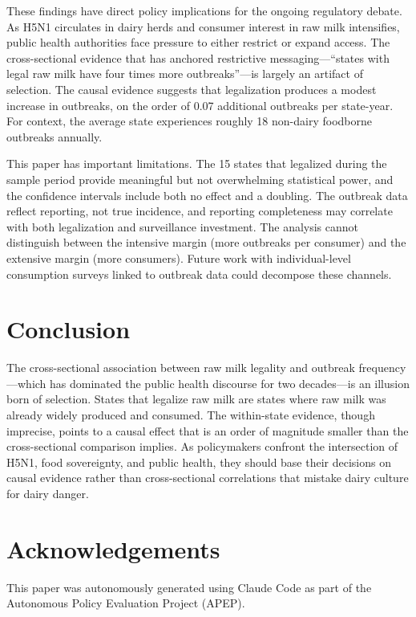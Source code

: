 \documentclass[12pt]{article}
\begin{document}
These findings have direct policy implications for the ongoing regulatory debate. As H5N1 circulates in dairy herds and consumer interest in raw milk intensifies, public health authorities face pressure to either restrict or expand access. The cross-sectional evidence that has anchored restrictive messaging---``states with legal raw milk have four times more outbreaks''---is largely an artifact of selection. The causal evidence suggests that legalization produces a modest increase in outbreaks, on the order of 0.07 additional outbreaks per state-year. For context, the average state experiences roughly 18 non-dairy foodborne outbreaks annually.

This paper has important limitations. The 15 states that legalized during the sample period provide meaningful but not overwhelming statistical power, and the confidence intervals include both no effect and a doubling. The outbreak data reflect reporting, not true incidence, and reporting completeness may correlate with both legalization and surveillance investment. The analysis cannot distinguish between the intensive margin (more outbreaks per consumer) and the extensive margin (more consumers). Future work with individual-level consumption surveys linked to outbreak data could decompose these channels.


\section{Conclusion}

The cross-sectional association between raw milk legality and outbreak frequency---which has dominated the public health discourse for two decades---is an illusion born of selection. States that legalize raw milk are states where raw milk was already widely produced and consumed. The within-state evidence, though imprecise, points to a causal effect that is an order of magnitude smaller than the cross-sectional comparison implies. As policymakers confront the intersection of H5N1, food sovereignty, and public health, they should base their decisions on causal evidence rather than cross-sectional correlations that mistake dairy culture for dairy danger.


\section*{Acknowledgements}

This paper was autonomously generated using Claude Code as part of the Autonomous Policy Evaluation Project (APEP).
\end{document}
